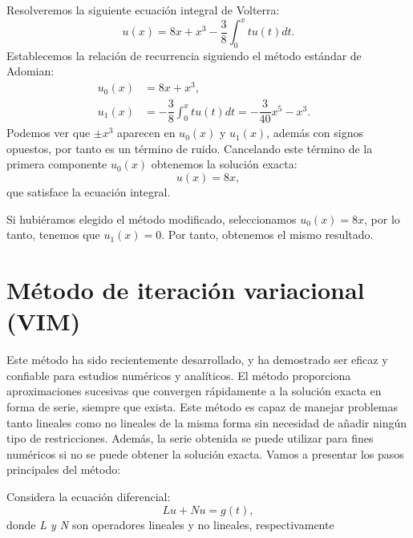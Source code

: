 \begin{ejemplo}
	Resolveremos la siguiente ecuación integral de Volterra:
	\begin{equation}
		u(x) = 8x + x^3 - \dfrac{3}{8} \int_{0}^{x} tu(t)dt.
	\end{equation}
	Establecemos la relación de recurrencia siguiendo el método estándar de Adomian:
	\begin{align}
		u_0(x) &= 8x + x^3,      &   \\
		u_1(x) &= - \dfrac{3}{8} \int_{0}^{x} tu(t)dt = - \dfrac{3}{40}x^5-x^3.    &
	\end{align}
	Podemos ver que $\pm x^3$ aparecen en $u_0(x)$ y $u_1(x)$, además con signos opuestos, por tanto es un término de ruido. Cancelando este término de la primera componente $u_0(x)$ obtenemos la solución exacta:
	\begin{equation}
		u(x) = 8x,
	\end{equation}
	que satisface la ecuación integral.
	\begin{observacion}
		Si hubiéramos elegido el método modificado, seleccionamos $u_0(x) = 8x$, por lo tanto, tenemos que $u_1(x) = 0$. Por tanto, obtenemos el mismo resultado.
	\end{observacion}
\end{ejemplo}

\section{Método de iteración variacional (VIM)}
Este método ha sido recientemente desarrollado, y ha demostrado ser eficaz y confiable para estudios numéricos y analíticos. El método proporciona aproximaciones sucesivas que convergen rápidamente a la solución exacta en forma de serie, siempre que exista. Este método es capaz de manejar problemas tanto lineales como no lineales de la misma forma sin necesidad de añadir ningún tipo de restricciones. Además, la serie obtenida se puede utilizar para fines numéricos si no se puede obtener la solución exacta. Vamos a presentar los pasos principales del método:

Considera la ecuación diferencial:
\begin{equation}
	Lu + Nu = g(t),
\end{equation}
donde \textit{L y N} son operadores lineales y no lineales, respectivamente



\endinput
